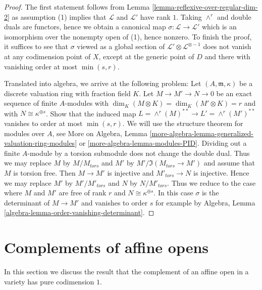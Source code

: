 \begin{proof}
The first statement follows from Lemma \ref{lemma-reflexive-over-regular-dim-2}
as assumption (1) implies that $\mathcal{L}$ and $\mathcal{L}'$
have rank $1$. Taking $\wedge^r$ and double duals are functors, hence
we obtain a canonical map $\sigma : \mathcal{L} \to \mathcal{L}'$
which is an isomorphism over the nonempty open of (1), hence
nonzero. To finish the proof, it suffices to see that
$\sigma$ viewed as a global section of
$\mathcal{L}' \otimes \mathcal{L}^{\otimes -1}$ does not
vanish at any codimension point of $X$, except at the generic
point of $D$ and there with vanishing order at most $\min(s, r)$.

\medskip\noindent
Translated into algebra, we arrive at the following problem:
Let $(A, \mathfrak m, \kappa)$ be a discrete valuation ring
with fraction field $K$. Let $M \to M' \to N \to 0$ be an exact sequence
of finite $A$-modules with $\dim_K(M \otimes K) = \dim_K(M' \otimes K) = r$
and with $N \cong \kappa^{\oplus s}$. Show that the induced map
$L = \wedge^r(M)^{**} \to L' = \wedge^r(M')^{**}$ vanishes to
order at most $\min(s, r)$. We will use the structure theorem for
modules over $A$, see
More on Algebra, Lemma
\ref{more-algebra-lemma-generalized-valuation-ring-modules} or
\ref{more-algebra-lemma-modules-PID}.
Dividing out a finite $A$-module by a torsion submodule does not
change the double dual.
Thus we may replace $M$ by $M/M_{tors}$ and $M'$ by
$M'/\Im(M_{tors} \to M')$ and assume that $M$ is torsion free.
Then $M \to M'$ is injective and $M'_{tors} \to N$ is injective.
Hence we may replace $M'$ by $M'/M'_{tors}$ and $N$ by $N/M'_{tors}$.
Thus we reduce to the case where $M$ and $M'$ are free of rank $r$
and $N \cong \kappa^{\oplus s}$. In this case $\sigma$
is the determinant of $M \to M'$ and vanishes to order $s$
for example by Algebra, Lemma \ref{algebra-lemma-order-vanishing-determinant}.
\end{proof}









\section{Complements of affine opens}
\label{section-complement-affine-open}

\noindent
In this section we discuss the result that the complement of an
affine open in a variety has pure codimension $1$.

